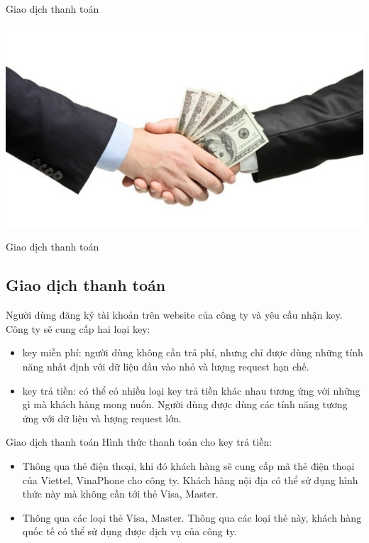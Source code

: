 \documentclass{beamer}
\begin{document}
\begin{frame}{Giao dịch thanh toán}
\begin{center}
\includegraphics[scale=0.4]{giaodich.jpg}
\end{center}
\end{frame}
\begin{frame}{Giao dịch thanh toán}
\subsection{Giao dịch thanh toán}


Người dùng đăng ký tài khoản trên website của công ty và yêu cầu nhận key.\\
Công ty sẽ cung cấp hai loại key:
\begin{itemize}
\item key miễn phí: người dùng không cần trả phí, nhưng chỉ được dùng những tính năng nhất định với dữ liệu đầu vào nhỏ và lượng request hạn chế.
\item key trả tiền: có thể có nhiều loại key trả tiền khác nhau tương ứng với những gì mà khách hàng mong nuốn. Người dùng được dùng các tính năng tương ứng với dữ liệu và lượng request lớn. 
\end{itemize}
\end{frame}
\begin{frame}{Giao dịch thanh toán}
Hình thức thanh toán cho key trả tiền: \\
\begin{itemize}
\item Thông qua thẻ điện thoại, khi đó khách hàng sẽ cung cấp mã thẻ điện thoại của Viettel, VinaPhone cho công ty. Khách hàng nội địa có thể sử dụng hình thức này mà không cần tới thẻ Visa, Master.
\item Thông qua các loại thẻ Visa, Master. Thông qua các loại thẻ này, khách hàng quốc tế có thể sử dụng được dịch vụ của công ty.

\end{itemize}


\end{frame}
\end{document}
